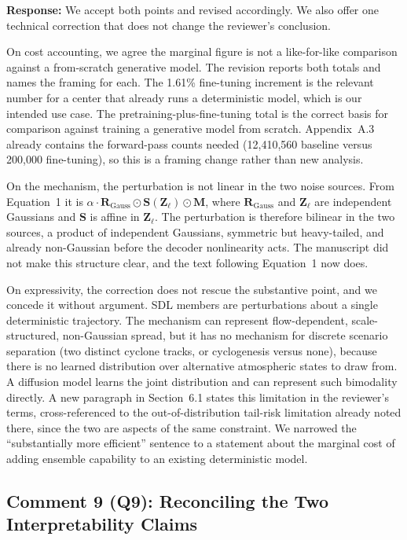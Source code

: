 \documentclass[12pt]{article}
\begin{document}
\textbf{Response:} We accept both points and revised accordingly. We also
offer one technical correction that does not change the reviewer's conclusion.

On cost accounting, we agree the marginal figure is not a like-for-like comparison
against a from-scratch generative model. The revision reports both totals and names the framing for each. The 1.61\%
fine-tuning increment is the relevant number for a center that already runs a
deterministic model, which is our intended use case. The pretraining-plus-fine-tuning
total is the correct basis for comparison against training a generative model from
scratch.
Appendix~A.3 already contains the forward-pass counts needed (12{,}410{,}560 baseline
versus 200{,}000 fine-tuning), so this is a framing change rather than new analysis.

On the mechanism, the perturbation is not linear in the two noise sources. From
Equation~1 it is $\alpha \cdot \mathbf{R}_{\text{Gauss}} \odot
\mathbf{S}(\mathbf{Z}_\ell) \odot \mathbf{M}$, where $\mathbf{R}_{\text{Gauss}}$ and
$\mathbf{Z}_\ell$ are independent Gaussians and $\mathbf{S}$ is affine in
$\mathbf{Z}_\ell$. The perturbation is therefore bilinear in the two sources, a
product of independent Gaussians, symmetric but heavy-tailed, and already
non-Gaussian before the decoder nonlinearity acts. The manuscript did not make this
structure clear, and the text following Equation~1 now does.

On expressivity, the correction does not rescue the substantive point, and we concede
it without argument. SDL members are perturbations about a single deterministic
trajectory. The mechanism can represent flow-dependent, scale-structured,
non-Gaussian spread, but it has no mechanism for discrete scenario separation (two
distinct cyclone tracks, or cyclogenesis versus none), because there is no learned
distribution over alternative atmospheric states to draw from. A diffusion model
learns the joint distribution and can represent such bimodality directly. A new
paragraph in Section~6.1 states this limitation in the reviewer's terms,
cross-referenced to the out-of-distribution tail-risk limitation already noted there,
since the two are aspects of the same constraint. We narrowed the ``substantially more
efficient'' sentence to a statement about the marginal cost of
adding ensemble capability to an existing deterministic model.

\subsection*{Comment 9 (Q9): Reconciling the Two Interpretability Claims}
\end{document}
